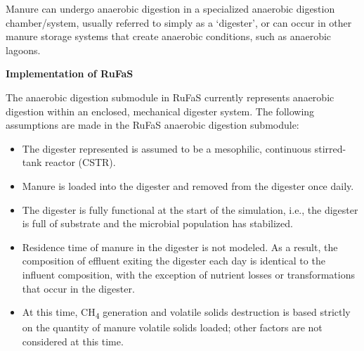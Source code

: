 \begin{refsection}
Manure can undergo anaerobic digestion in a specialized anaerobic digestion chamber/system, usually referred to simply as a ‘digester’, or can occur in other manure storage systems that create anaerobic conditions, such as anaerobic lagoons. 
\vspace{0.5cm}

\textbf{Implementation of RuFaS}
\vspace{0.2cm}
    
The anaerobic digestion submodule in RuFaS currently represents anaerobic digestion within an enclosed, mechanical digester system. The following assumptions are made in the RuFaS anaerobic digestion submodule:



        \begin{itemize}
            \item The digester represented is assumed to be a mesophilic, continuous stirred-tank reactor (CSTR).
            \item Manure is loaded into the digester and removed from the digester once daily.
            \item The digester is fully functional at the start of the simulation, i.e., the digester is full of substrate and the microbial population has stabilized.
            \item Residence time of manure in the digester is not modeled. As a result, the composition of effluent exiting the digester each day is identical to the influent composition, with the exception of nutrient losses or transformations that occur in the digester.
            \item At this time, CH\textsubscript{4} generation and volatile solids destruction is based strictly on the quantity of manure volatile solids loaded; other factors are not considered at this time.
        \end{itemize}




\end{refsection}
